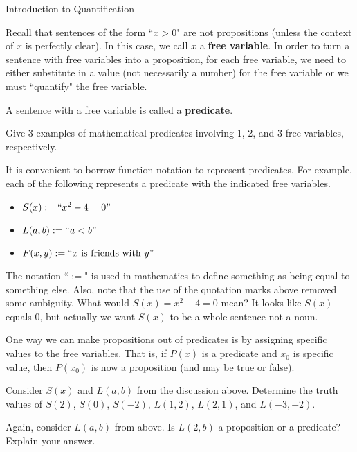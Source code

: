 \begin{section}{Introduction to Quantification}

Recall that sentences of the form ``$x>0$" are not propositions (unless the context of $x$ is perfectly clear).  In this case, we call $x$ a \textbf{free variable}.  In order to turn a sentence with free variables into a proposition, for each free variable, we need to either substitute in a value (not necessarily a number) for the free variable or we must ``quantify" the free variable.  

\begin{definition}
A sentence with a free variable is called a \textbf{predicate}.
\end{definition}

\begin{exercise}
Give 3 examples of mathematical predicates involving 1, 2, and 3 free variables, respectively.
\end{exercise}

It is convenient to borrow function notation to represent predicates.  For example, each of the following represents a predicate with the indicated free variables.
\begin{itemize}
\item $S(x):=``x^2-4=0"$
\item $L(a,b):=``a<b"$
\item $F(x,y):=``x \mbox{ is friends with } y"$
\end{itemize}

The notation ``$:=$" is used in mathematics to define something as being equal to something else.  Also, note that the use of the quotation marks above removed some ambiguity.  What would $S(x)=x^2-4=0$ mean?  It looks like $S(x)$ equals 0, but actually we want $S(x)$ to be a whole sentence not a noun. 

One way we can make propositions out of predicates is by assigning specific values to the free variables.  That is, if $P(x)$ is a predicate and $x_0$ is specific value, then $P(x_0)$ is now a proposition (and may be true or false).

\begin{exercise}
Consider $S(x)$ and $L(a,b)$ from the discussion above.  Determine the truth values of $S(2)$, $S(0)$, $S(-2)$, $L(1,2)$, $L(2,1)$, and $L(-3,-2)$.
\end{exercise}

\begin{exercise}
Again, consider $L(a,b)$ from above.  Is $L(2,b)$ a proposition or a predicate?  Explain your answer.
\end{exercise}


\end{section}
